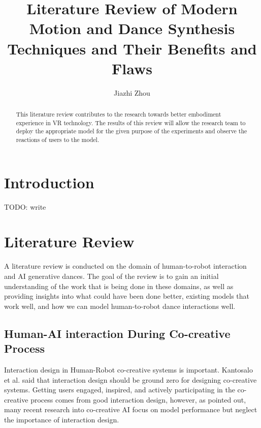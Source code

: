 \documentclass[final,5p,times,twocolumn,authoryear]{article}
\begin{document}
\title{Literature Review of Modern Motion and Dance Synthesis Techniques and Their Benefits and Flaws}
\author{Jiazhi Zhou}
\maketitle

\begin{abstract}

This literature review contributes to the research towards better embodiment experience in VR technology. The results of this review will allow the research team to deploy the appropriate model for the given purpose of the experiments and observe the reactions of users to the model.

\end{abstract}

\section{Introduction}

TODO: write

\section{Literature Review}

A literature review is conducted on the domain of human-to-robot
interaction and AI generative dances. The goal of the review is to gain
an initial understanding of the work that is being done in these
domains, as well as providing insights into what could have been done
better, existing models that work well, and how we can model
human-to-robot dance interactions well.

\subsection{Human-AI interaction During Co-creative Process}

Interaction design in Human-Robot co-creative systems is important.
Kantosalo et al. \cite{Kantosalo2020} said that interaction design should be
ground zero for designing co-creative systems. Getting users engaged,
inspired, and actively participating in the co-creative process comes
from good interaction design, however, as \cite{Rezwana2023} pointed
out, many recent research into co-creative AI focus on model performance
but neglect the importance of interaction design. 
\end{document}
